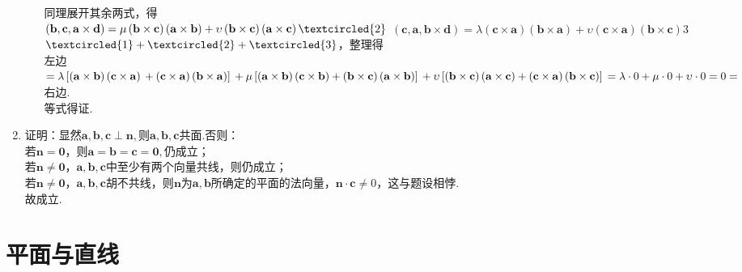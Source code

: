\documentclass[UTF8]{ctexart}
\begin{document}
\begin{enumerate}
\begin{enumerate}[(1)]
同理展开其余两式，得\\
$\left(\mathbf{b},\mathbf{c},\mathbf{a}\times\mathbf{d}\right)=\mu\left(\mathbf{b}\times\mathbf{c}\right)\left(\mathbf{a}\times\mathbf{b}\right)+\upsilon\left(\mathbf{b}\times\mathbf{c}\right)\left(\mathbf{a}\times\mathbf{c}\right)\textcircled{2}\\$
$\left(\mathbf{c},\mathbf{a},\mathbf{b}\times\mathbf{d}\right)=\lambda\left(\mathbf{c}\times\mathbf{a}\right)\left(\mathbf{b}\times\mathbf{a}\right)+\upsilon\left(\mathbf{c}\times\mathbf{a}\right)\left(\mathbf{b}\times\mathbf{c}\right)$\textcircled{3}\\
$\textcircled{1}+\textcircled{2}+\textcircled{3}$，整理得\\
左边$=\lambda\left[\left(\mathbf{a}\times\mathbf{b}\right)\left(\mathbf{c}\times\mathbf{a}\right)\\
+\left(\mathbf{c}\times\mathbf{a}\right)\left(\mathbf{b}\times\mathbf{a}\right)\right]\\
+\mu\left[\left(\mathbf{a}\times\mathbf{b}\right)\left(\mathbf{c}\times\mathbf{b}\right)+\left(\mathbf{b}\times\mathbf{c}\right)\left(\mathbf{a}\times\mathbf{b}\right)\right]\\
+\upsilon\left[\left(\mathbf{b}\times\mathbf{c}\right)\left(\mathbf{a}\times\mathbf{c}\right)+\left(\mathbf{c}\times\mathbf{a}\right)\left(\mathbf{b}\times\mathbf{c}\right)\right]\\
=\lambda\cdot0+\mu\cdot0+\upsilon\cdot0\\
=0=$右边.\\
等式得证. 
\end{enumerate}

\item 证明：显然$\mathbf{a},\mathbf{b},\mathbf{c}\perp\mathbf{n},$则$\mathbf{a},\mathbf{b},\mathbf{c}$共面.否则：\\
若$\mathbf{n}=\mathbf{0}$，则$\mathbf{a}=\mathbf{b}=\mathbf{c}=\mathbf{0},$仍成立；\\
若$\mathbf{n}\neq\mathbf{0}$，$\mathbf{a},\mathbf{b},\mathbf{c}$中至少有两个向量共线，则仍成立；\\
若$\mathbf{n}\neq\mathbf{0}$，$\mathbf{a},\mathbf{b},\mathbf{c}$胡不共线，则$\mathbf{n}$为$\mathbf{a},\mathbf{b}$所确定的平面的法向量，$\mathbf{n}\cdot\mathbf{c}\neq0$，这与题设相悖.\\
故成立. 
\end{enumerate}

\section{平面与直线}
\end{document}
